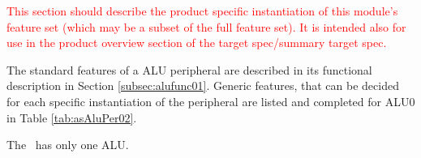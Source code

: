 \textcolor{red}{This section should describe the product specific instantiation of this module’s feature set (which may be a subset of the full feature set). It is intended also for use in the product overview section of the target spec/summary target spec.}

The standard features of a ALU peripheral are described in its functional description in Section \ref{subsec:alufunc01}. Generic features, that can be decided for each specific instantiation of the peripheral are listed and completed for ALU0 in Table \ref{tab:asAluPer02}.

The \aschip \, has only one ALU.
